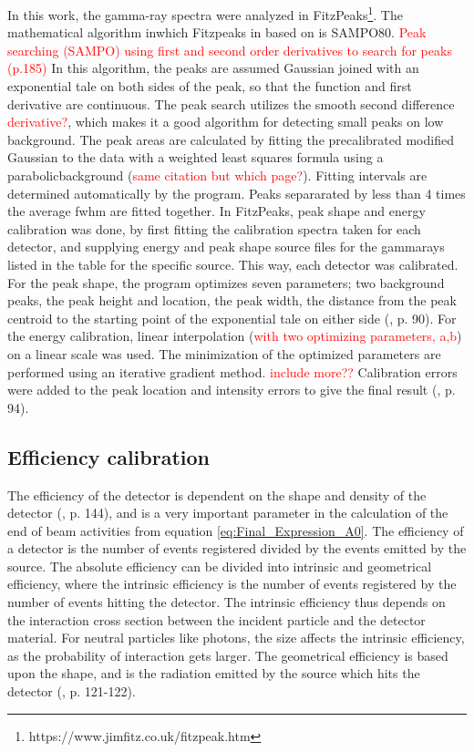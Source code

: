 \noindent 
In this work, the gamma-ray spectra were analyzed in FitzPeaks\footnote{https://www.jimfitz.co.uk/fitzpeak.htm}. The mathematical algorithm inwhich Fitzpeaks in based on is SAMPO80\cite{Koskelo1981}. \textcolor{red}{Peak searching (SAMPO) using first and second order derivatives to search for peaks \cite{Gilmore2008} (p.185)}  In this algorithm, the peaks are assumed Gaussian joined with an exponential tale on both sides of the peak, so that the function and first derivative are continuous. The peak search utilizes the smooth second difference \textcolor{red}{derivative?}, which makes it a good algorithm for detecting small peaks on low background\cite{Koskelo1981}. The peak areas are calculated by fitting the precalibrated modified Gaussian to the data with a weighted least squares formula using a parabolicbackground (\textcolor{red}{same citation but which page?}).  Fitting intervals are determined automatically by the program.  Peaks separarated by less than 4 times the average fwhm are fitted together. In FitzPeaks, peak shape and energy calibration was done, by first fitting the calibration spectra taken for each detector, and  supplying energy and peak shape source files for the gammarays listed in the table for the specific source. This way, each detector was calibrated. For the peak shape, the program optimizes seven parameters; two background peaks, the peak height and location, the peak width, the distance from the peak centroid to the starting point of the exponential tale on either side (\cite{Koskelo1981}, p. 90). 
For the energy calibration, linear interpolation (\textcolor{red}{with two optimizing parameters, a,b}) on a linear scale was used. The minimization of the optimized parameters are performed using an iterative gradient method. \textcolor{red}{include more??}  Calibration errors were added to the peak location and intensity errors to give the final result (\cite{Koskelo1981}, p. 94). 





\noindent 
\subsection{Efficiency calibration}
The efficiency of the detector is dependent on the shape and density of the detector (\cite{Gilmore2008}, p. 144), and is a very important parameter in the calculation of the end of beam activities from equation \ref{eq:Final_Expression_A0}. The efficiency of a detector is the number of events registered divided by the events emitted by the source. The absolute efficiency can be divided into intrinsic and geometrical efficiency, where the intrinsic efficiency is the number of events registered by the number of events hitting the detector. The intrinsic efficiency thus depends on the interaction cross section between the incident particle and the detector material. For neutral particles like photons, the size affects the intrinsic efficiency, as the probability of interaction gets larger. The geometrical efficiency is based upon the shape, and is the radiation emitted by the source which hits the detector (\cite{Leo1994}, p. 121-122).\\ 

